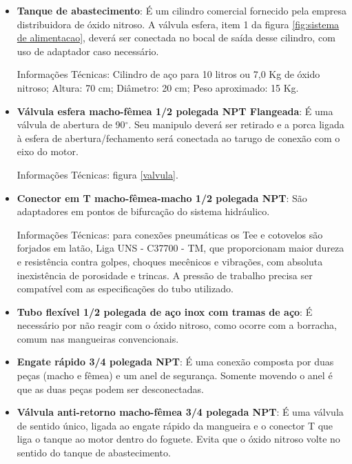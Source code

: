 \begin{itemize}

    \item \textbf{Tanque de abastecimento}: É um cilindro comercial fornecido pela empresa distribuidora de óxido nitroso. A válvula esfera, item 1 da figura \ref{fig:sistema de alimentacao}, deverá ser conectada no bocal de saída desse cilindro, com uso de adaptador caso necessário.
    \par Informações Técnicas: Cilindro de aço para 10 litros ou 7,0 Kg de óxido nitroso; Altura: 70 cm;    Diâmetro: 20 cm; Peso aproximado: 15 Kg.
    
    \item \textbf{Válvula esfera macho-fêmea 1/2 polegada NPT Flangeada}: É uma válvula de abertura de 90$^{\circ}$. Seu manipulo deverá ser retirado e a porca ligada à esfera de abertura/fechamento será conectada ao tarugo de conexão com o eixo do motor. 
     \par Informações Técnicas: figura \ref{valvula}.
    
    \item \textbf{Conector em T macho-fêmea-macho 1/2 polegada NPT}: São adaptadores em pontos de bifurcação do sistema hidráulico.
    \par Informações Técnicas: para conexões pneumáticas os Tee e cotovelos são forjados em latão, Liga UNS - C37700 - TM, que proporcionam maior dureza e resistência contra golpes, choques mecênicos e vibrações, com absoluta inexistência de porosidade e trincas. A pressão de trabalho precisa ser compatível com as especificações do tubo utilizado.
    
    \item \textbf{Tubo flexível 1/2 polegada de aço inox com tramas de aço}: É necessário por não reagir com o óxido nitroso, como ocorre com a borracha, comum nas mangueiras convencionais.
    
    \item \textbf{Engate rápido 3/4 polegada NPT}: É uma conexão composta por duas peças (macho e fêmea) e um anel de segurança. Somente movendo o anel é que as duas peças podem ser desconectadas.
    
    \item \textbf{Válvula anti-retorno macho-fêmea 3/4 polegada NPT}: É uma válvula de sentido único, ligada ao engate rápido da mangueira e o conector T que liga o tanque ao motor dentro do foguete. Evita que o óxido nitroso volte no sentido do tanque de abastecimento.
    
\end{itemize}   

